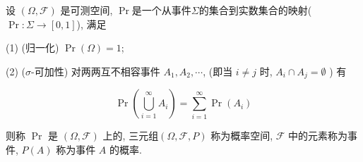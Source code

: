 \documentclass{ctexart}
\begin{document}
\begin{definition}
    设 $(\Omega, \mathcal{F})$ 是可测空间, $\Pr$是一个从事件$\Sigma$的集合到实数集合的映射($\Pr:\Sigma\to [0,1]$), 满足

(1) (归一化) $\Pr(\Omega)=1$;


(2) ($\sigma$-可加性) 对两两互不相容事件 $A_{1}, A_{2}, \cdots$, (即当 $i \neq j$ 时, $A_{i} \cap A_{j}=\emptyset$ ) 有

$$
\Pr\left(\bigcup_{i=1}^{\infty} A_{i}\right)=\sum_{i=1}^{\infty} \Pr\left(A_{i}\right)
$$

则称 $\Pr$ 是 $(\Omega, \mathcal{F})$ 上的, 三元组$(\Omega, \mathcal{F}, P)$ 称为概率空间, $\mathcal{F}$ 中的元素称为事件, $P(A)$ 称为事件 $A$ 的概率.
\end{definition}
\end{document}

